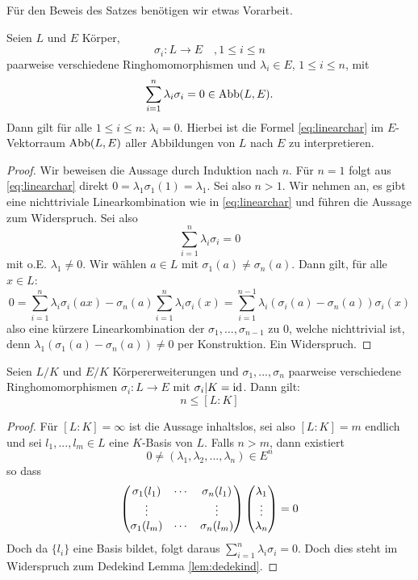 \documentclass{book}
\begin{document}
Für den Beweis des Satzes benötigen wir etwas Vorarbeit. 

\begin{lem}
    \label{lem:dedekind}
    Seien $L$ und $E$ Körper, 
    \[
        \sigma_i: L \to E  \quad , 1 \le i \le n
    \]
    paarweise verschiedene Ringhomomorphismen und $\lambda_i \in E$, $1 \le i \le n$, mit
    \begin{equation}
        \label{eq:linearchar}
        \sum_{i=1}^n \lambda_i \sigma_i = 0 \in \operatorname{Abb}(L,E).
    \end{equation}
    Dann gilt für alle $1 \le i \le n$: $\lambda_i = 0$. Hierbei ist die Formel
    \eqref{eq:linearchar} im $E$-Vektorraum $\operatorname{Abb}(L,E)$ aller Abbildungen von
    $L$ nach $E$ zu interpretieren.
\end{lem}
\begin{proof}
    Wir beweisen die Aussage durch Induktion nach $n$. Für $n =1$ folgt aus
    \eqref{eq:linearchar} direkt $0 = \lambda_1 \sigma_1(1) = \lambda_1$. Sei
    also $n >1$. Wir nehmen an, es gibt eine nichttriviale Linearkombination
    wie in \eqref{eq:linearchar} und führen die Aussage zum Widerspruch. Sei also 
    \[
        \sum_{i=1}^n \lambda_i \sigma_i = 0
    \]
    mit o.E. $\lambda_1 \ne 0$. Wir wählen $a \in L$ mit $\sigma_1(a) \ne
    \sigma_n(a)$. Dann gilt, für alle $x \in L$:
    \[
        0 = \sum_{i=1}^n \lambda_i \sigma_i(ax) - \sigma_n(a) \sum_{i=1}^n
        \lambda_i \sigma_i(x) = \sum_{i=1}^{n-1} \lambda_i(\sigma_i(a) -
        \sigma_n(a)) \sigma_i(x)
    \]
    also eine kürzere Linearkombination der $\sigma_1, ..., \sigma_{n-1}$ zu
    $0$, welche nichttrivial ist, denn $\lambda_1(\sigma_1(a) - \sigma_n(a))
    \ne 0$ per Konstruktion. Ein Widerspruch.
\end{proof}

\begin{thm}
    \label{thm:dedekind}
    Seien $L/K$ und $E/K$ Körpererweiterungen und $\sigma_1, ..., \sigma_n$
    paarweise verschiedene Ringhomomorphismen $\sigma_i: L \to E$ mit
    $\sigma_i|K = \operatorname{id}$. Dann gilt:
    \[
        n \le [L:K]
    \]
\end{thm}
\begin{proof}
    Für $[L:K] = \infty$ ist die Aussage inhaltslos, sei also $[L:K] =m$
    endlich und sei $l_1, ..., l_m \in L$ eine $K$-Basis von $L$. Falls $n > m$, dann existiert 
    \[
        0 \ne (\lambda_1, \lambda_2, ..., \lambda_n) \in E^n
    \]
    so dass
    \[
        \begin{pmatrix}  \sigma_1(l_1) & \cdots & \sigma_n(l_1)\\ \vdots & & \vdots \\ \sigma_1(l_m) & \cdots & \sigma_n(l_m)  \end{pmatrix} \begin{pmatrix}  \lambda_1 \\ \vdots \\ \lambda_n  \end{pmatrix} = 0
    \]
    Doch da $\{l_i\}$ eine Basis bildet, folgt daraus $\sum_{i=1}^n \lambda_i
    \sigma_i = 0$. Doch dies steht im Widerspruch zum Dedekind Lemma
    \ref{lem:dedekind}.
\end{proof}
\end{document}
